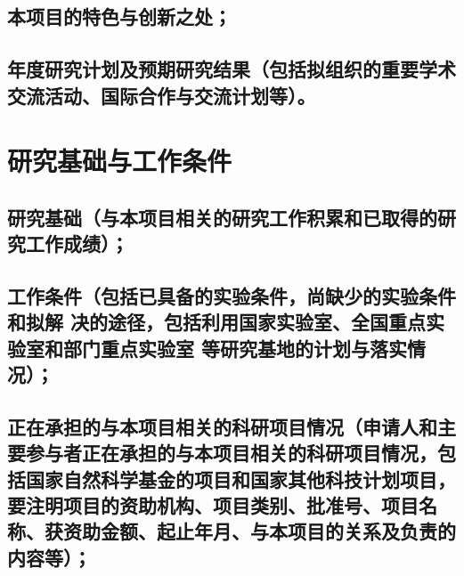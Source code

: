 \documentclass[UTF8, punct, oneside, fontset=none]{ctexbook}
\begin{document}
\begin{MS}
	
\end{MS}

\section{\textbf{本项目的特色与创新之处；}}

\begin{MS}
	
\end{MS}

\section{\textbf{年度研究计划及预期研究结果}（包括拟组织的重要学术交流活动、国际合作与交流计划等）。}

\begin{MS}
	
\end{MS}

\chapter{\textbf{研究基础与工作条件}}
\section{\textbf{研究基础}（与本项目相关的研究工作积累和已取得的研究工作成绩）；}

\begin{MS}
	
\end{MS}

\section{\textbf{工作条件}（包括已具备的实验条件，尚缺少的实验条件和拟解
决的途径，包括利用国家实验室、全国重点实验室和部门重点实验室
等研究基地的计划与落实情况）；}

\begin{MS}
	
\end{MS}

\section{\textbf{正在承担的与本项目相关的科研项目情况}（申请人和主要参与者正在承担的与本项目相关的科研项目情况，\kg{0.18em}包括国家自然科学基金的项目和国家其他科技计划项目，要注明项目的资助机构、项目类别、批准号、\kg{0.1em}项目名称、\kg{0.1em}获资助金额、\kg{0.1em}起止年月、\kg{0.1em}与本项目的关系及负责的内容等）；}
\end{document}
